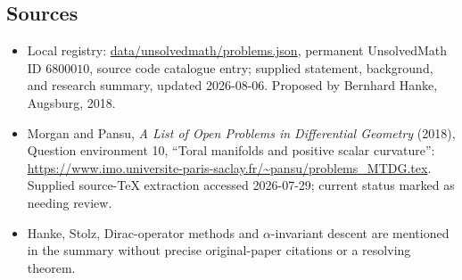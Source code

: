 \documentclass[11pt]{article}
\begin{document}
\subsection{Sources}
\begin{itemize}
\item Local registry: \url{data/unsolvedmath/problems.json}, permanent UnsolvedMath ID \(6800010\), source code catalogue entry; supplied statement, background, and research summary, updated 2026-08-06. Proposed by Bernhard Hanke, Augsburg, 2018.
\item Morgan and Pansu, \emph{A List of Open Problems in Differential Geometry} (2018), Question environment 10, ``Toral manifolds and positive scalar curvature'': \url{https://www.imo.universite-paris-saclay.fr/~pansu/problems_MTDG.tex}. Supplied source-TeX extraction accessed 2026-07-29; current status marked as needing review.
\item Hanke, Stolz, Dirac-operator methods and \(\alpha\)-invariant descent are mentioned in the summary without precise original-paper citations or a resolving theorem.
\end{itemize}
\end{document}
